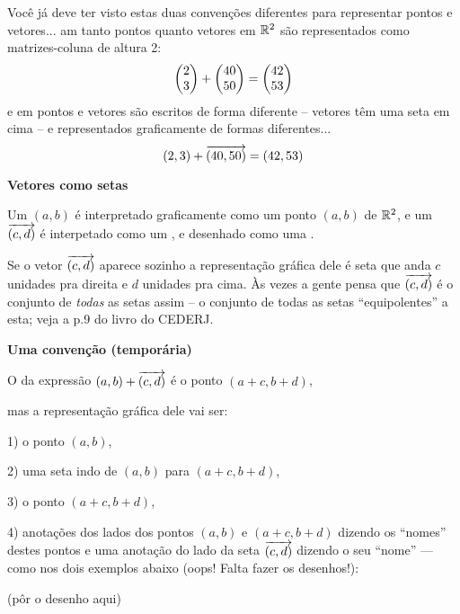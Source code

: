 \documentclass[oneside,12pt]{article}
\begin{document}
Você já deve ter visto estas duas convenções diferentes para
representar pontos e vetores... am  tanto
pontos quanto vetores em $\mathbb{R}^2$ são representados como matrizes-coluna
de altura 2:
%
$$\left (\begin{matrix}2\\3\end{matrix}\right ) + \left (\begin{matrix}40\\50\end{matrix}\right ) = \left (\begin{matrix}42\\53\end{matrix}\right )$$
%
e em  pontos e vetores são escritos de
forma diferente -- vetores têm uma seta em cima -- e representados
graficamente de formas diferentes...
%
$$(2,3) + {\overrightarrow{(40,50)}} = (42,53)$$
%


\newpage


{\bf Vetores como setas}

Um  $(a,b)$ é interpretado graficamente como um ponto
$(a,b)$ de $\mathbb{R}^2$, e um  ${\overrightarrow{(c,d)}}$ é interpetado
como um , e desenhado como uma .

Se o vetor ${\overrightarrow{(c,d)}}$ aparece sozinho a representação gráfica dele é
 seta que anda $c$ unidades pra direita e $d$
unidades pra cima. Às vezes a gente pensa que ${\overrightarrow{(c,d)}}$ é o conjunto
de {\sl todas} as setas assim -- o conjunto de todas as setas
``equipolentes'' a esta; veja a p.9 do livro do CEDERJ.

\newpage


{\bf Uma convenção (temporária)}

O  da expressão $(a,b)+{\overrightarrow{(c,d)}}$ é o ponto
$(a+c,b+d)$,

mas a representação gráfica dele vai ser:

1) o ponto $(a,b)$,

2) uma seta indo de $(a,b)$ para $(a+c,b+d)$,

3) o ponto $(a+c,b+d)$,

4) anotações dos lados dos pontos $(a,b)$ e $(a+c,b+d)$ dizendo os
``nomes'' destes pontos e uma anotação do lado da seta ${\overrightarrow{(c,d)}}$
dizendo o seu ``nome'' --- como nos dois exemplos abaixo (oops! Falta
fazer os desenhos!):

\msk

(pôr o desenho aqui)
\end{document}
